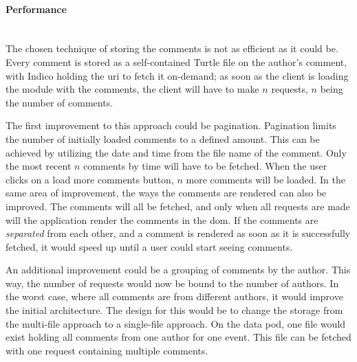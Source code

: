 \paragraph{Performance}\label{paragraph:evaluation-performance}\mbox{}\\

The chosen technique of storing the comments is not as efficient as it could be. Every comment is stored as a self-contained Turtle file on the author's comment, with Indico holding the \gls{uri} to fetch it on-demand; as soon as the client is loading the module with the comments, the client will have to make $n$ requests, $n$ being the number of comments.

The first improvement to this approach could be pagination. Pagination limits the number of initially loaded comments to a defined amount. This can be achieved by utilizing the date and time from the file name of the comment. Only the most recent $n$ comments by time will have to be fetched. When the user clicks on a load more comments button, $n$ more comments will be loaded.
In the same area of improvement, the ways the comments are rendered can also be improved. The comments will all be fetched, and only when all requests are made will the application render the comments in the \gls{dom}. If the comments are \textit{separated} from each other, and a comment is rendered as soon as it is successfully fetched, it would speed up until a user could start seeing comments.

An additional improvement could be a grouping of comments by the author. This way, the number of requests would now be bound to the number of authors. In the worst case, where all comments are from different authors, it would improve the initial architecture. The design for this would be to change the storage from the multi-file approach to a single-file approach. On the data pod, one file would exist holding all comments from one author for one event. This file can be fetched with one request containing multiple comments.

